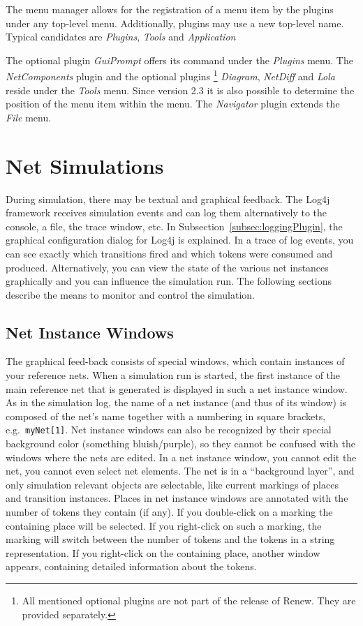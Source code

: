 The menu manager allows for the registration of a menu item by the
plugins under any top-level menu.
%
Additionally, plugins may use a new top-level name.
%
Typical candidates are \emph{Plugins}, \emph{Tools} and
\emph{Application}

The optional plugin \emph{GuiPrompt} offers
its command under the \emph{Plugins} menu. The \emph{NetComponents}
plugin and the optional plugins%
\footnote{All mentioned optional plugins are not part of the release
of Renew. They are provided separately.} \emph{Diagram}, 
\emph{NetDiff} and \emph{Lola} reside under the
\emph{Tools} menu. Since version 2.3 it is also possible to
determine the position of the menu item within the menu. The
\emph{Navigator} plugin extends the \emph{File} menu.

\section{Net Simulations}
\label{sec:simcontr}

During simulation, there may be textual and graphical feedback.
The Log4j framework receives simulation events and can log them
alternatively to the console, a file, the trace window, etc.
In Subsection~\ref{subsec:loggingPlugin}, the graphical configuration dialog
for Log4j is explained.
In a trace of log events, you can see exactly which transitions fired and
which tokens were consumed and produced.
Alternatively, you can view the state of the various net instances graphically
and you can influence the simulation run. 
The following sections describe the means to monitor and control the simulation.


\subsection{Net Instance Windows}\label{subsec:netinstwind}

The graphical feed-back consists of special windows, which contain
instances of your reference nets.
When a simulation run is started,
the first instance of the main reference net that is generated is
displayed in such a net instance window.
As in the simulation log, the name of a net instance
(and thus of its window) is composed of the net's name together
with a numbering in square brackets, e.g.\ \texttt{myNet[1]}.
Net instance windows can also be recognized by their special
background color (something bluish/purple), so they cannot
be confused with the windows where the nets are edited.
In a net instance window, you cannot edit the net, you cannot
even select net elements. The net is in a ``background layer'',
and only simulation relevant objects are selectable, like
current markings of places and transition instances.
Places in net instance windows are annotated with the number of
tokens they contain (if any).
If you double-click on a marking the containing place will be selected.
If you right-click on such a marking, the marking will switch between 
the number of tokens and the tokens in a string representation.
If you right-click on the containing place, another window appears,
containing detailed information about the tokens.

